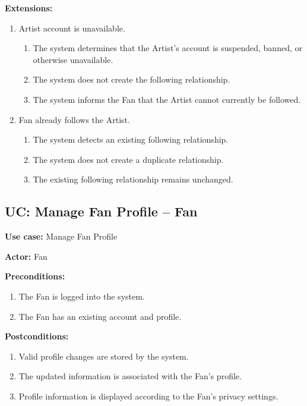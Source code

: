 \documentclass[11pt]{report}
\begin{document}
{\bfseries Extensions:}
\begin{enumerate}
    \item[2a.] Artist account is unavailable.
    \begin{enumerate}
        \item[2a1.] The system determines that the Artist's account is suspended, banned, or otherwise unavailable.
        \item[2a2.] The system does not create the following relationship.
        \item[2a3.] The system informs the Fan that the Artist cannot currently be followed.
    \end{enumerate}

    \item[3a.] Fan already follows the Artist.
    \begin{enumerate}
        \item[3a1.] The system detects an existing following relationship.
        \item[3a2.] The system does not create a duplicate relationship.
        \item[3a3.] The existing following relationship remains unchanged.
    \end{enumerate}
\end{enumerate}


\subsection{UC: Manage Fan Profile -- Fan}

{\bfseries Use case:} Manage Fan Profile

{\bfseries Actor:} Fan

{\bfseries Preconditions:}
\begin{enumerate}
    \item The Fan is logged into the system.
    \item The Fan has an existing account and profile.
\end{enumerate}

{\bfseries Postconditions:}
\begin{enumerate}
    \item Valid profile changes are stored by the system.
    \item The updated information is associated with the Fan's profile.
    \item Profile information is displayed according to the Fan's privacy settings.
\end{enumerate}
\end{document}
